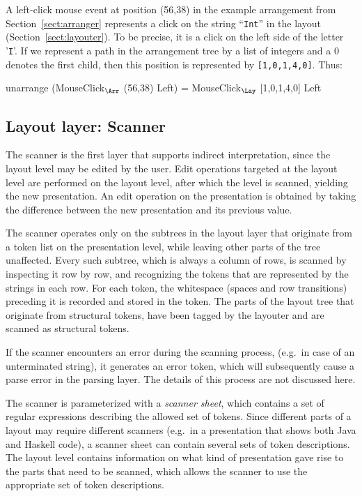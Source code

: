 A left-click mouse event at position (56,38) in the example arrangement from Section~\ref{sect:arranger} represents a click on the string ``\verb|Int|'' in the layout (Section~\ref{sect:layouter}). To be precise, it is a click on the left side of the letter '\verb|I|'. If we represent a path in the arrangement tree by a list of integers and a 0 denotes the first child, then this position is represented by \verb|[1,0,1,4,0]|. Thus:

\small \ttfamily
unarrange (MouseClick$_{\Arr}$ (56,38) Left) = MouseClick$_{\Lay}$ [1,0,1,4,0] Left
\rmfamily \normalsize


%																
\subsection{Layout layer: Scanner} \label{sect:scanner}

The scanner is the first layer that supports indirect interpretation, since the layout level may be edited by the user. Edit operations targeted at the layout level are performed on the layout level, after which the level is scanned, yielding the new presentation. An edit operation on the presentation is obtained by taking the difference between the new presentation and its previous value. 

The scanner operates only on the subtrees in the layout layer that originate from a token list on the presentation level, while leaving other parts of the tree unaffected. Every such subtree, which is always a column of rows, is scanned by inspecting it row by row, and recognizing the tokens that are represented by the strings in each row. For each token, the whitespace (spaces and row transitions) preceding it is recorded and stored in the token. The parts of the layout tree that originate from structural tokens, have been tagged by the layouter and are scanned as structural tokens.

If the scanner encounters an error during the scanning process, (e.g.\ in case of an unterminated string), it generates an error token, which will subsequently cause a parse error in the parsing layer. The details of this process are not discussed here. 

The scanner is parameterized with a {\em scanner sheet}, which contains a set of regular expressions describing the allowed set of tokens.  Since different parts of a layout may require different scanners (e.g.\ in a presentation that shows both Java and Haskell code), a scanner sheet can contain several sets of token descriptions. The layout level contains information on what kind of presentation gave rise to the parts that need to be scanned, which allows the scanner to use the appropriate set of token descriptions.


